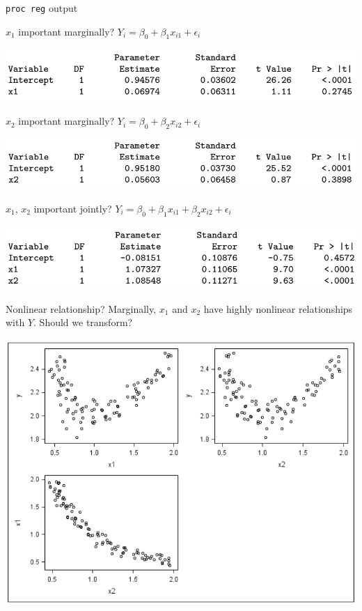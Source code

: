 \documentclass{beamer}
\begin{document}
\begin{frame}{\texttt{proc reg} output}
\centerline{$x_1$ important marginally? $Y_i=\beta_0+\beta_1 x_{i1}+\epsilon_i$}

\includegraphics[scale=0.35]{plots/x1}

\centerline{$x_2$ important marginally? $Y_i=\beta_0+\beta_2 x_{i2}+\epsilon_i$}

\includegraphics[scale=0.35]{plots/x2}

\centerline{$x_1$, $x_2$ important jointly? $Y_i=\beta_0+\beta_1 x_{i1}+\beta_2 x_{i2}+\epsilon_i$}

\includegraphics[scale=0.35]{plots/x12}
\end{frame}

\begin{frame}{Nonlinear relationship?}
Marginally, $x_1$ and $x_2$ have highly nonlinear relationships with $Y$. Should we transform?

\centerline{\includegraphics[scale=0.3]{plots/nonlinear}}
\end{frame}
\end{document}
